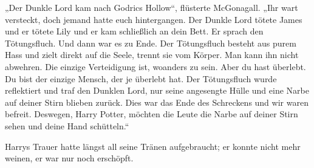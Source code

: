 „Der Dunkle Lord kam nach Godrics Hollow“, flüsterte McGonagall.
„Ihr wart versteckt, doch jemand hatte euch hintergangen. Der Dunkle Lord tötete James und er tötete Lily und er kam schließlich an dein Bett. Er sprach den Tötungsfluch. Und dann war es zu Ende. Der Tötungsfluch besteht aus purem Hass und zielt direkt auf die Seele, trennt sie vom Körper. Man kann ihn nicht abwehren. Die einzige Verteidigung ist, woanders zu sein. Aber du hast überlebt. Du bist der einzige Mensch, der je überlebt hat. Der Tötungsfluch wurde reflektiert und traf den Dunklen Lord, nur seine angesengte Hülle und eine Narbe auf deiner Stirn blieben zurück. Dies war das Ende des Schreckens und wir waren befreit. Deswegen, Harry Potter, möchten die Leute die Narbe auf deiner Stirn sehen und deine Hand schütteln.“

Harrys Trauer hatte längst all seine Tränen aufgebraucht; er konnte nicht mehr weinen, er war nur noch erschöpft.

